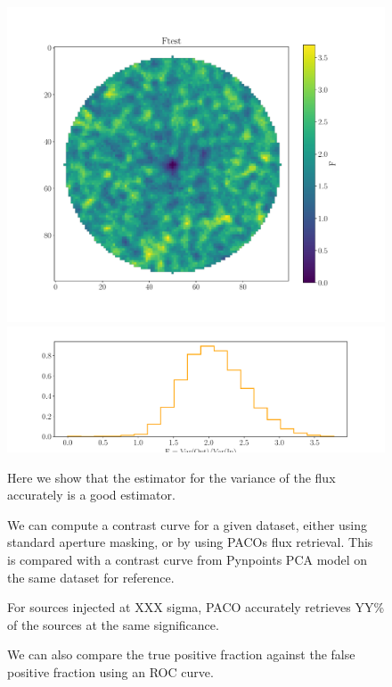 \documentclass[twocolumn,fleqn]{aastex62}
\begin{document}
\begin{figure}[h]
	\includegraphics[width=1.1\linewidth]{Ftest}
	\includegraphics[width=\linewidth]{Ftestdist}	
	\caption{\label{fig:Anova} Here we show that the estimator for the variance of the flux accurately is a good estimator.}
\end{figure}
\begin{figure}[h]
	\caption{\label{fig:Contrast} We can compute a contrast curve for a given dataset, either using standard aperture masking, or by using PACOs flux retrieval. This is compared with a contrast curve from Pynpoints PCA model on the same dataset for reference.}
\end{figure}
\begin{figure}[h]
	\caption{\label{fig:Completeness} For sources injected at XXX sigma, PACO accurately retrieves YY\% of the sources at the same significance.}
\end{figure}
\begin{figure}[h]
	\caption{\label{fig:ROC} We can also compare the true positive fraction against the false positive fraction using an ROC curve.}
\end{figure}
\end{document}
